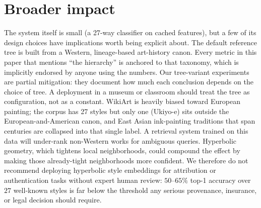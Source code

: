 \section*{Broader impact}
\label{sec:impact}

The system itself is small (a 27-way classifier on cached features),
but a few of its design choices have implications worth being explicit
about. The default reference tree is built from a Western,
lineage-based art-history canon. Every metric in this paper that
mentions ``the hierarchy'' is anchored to that taxonomy, which is
implicitly endorsed by anyone using the numbers. Our tree-variant
experiments are partial mitigation: they document how much each
conclusion depends on the choice of tree. A deployment in a museum or
classroom should treat the tree as configuration, not as a constant.
WikiArt is heavily biased toward European painting; the corpus has
27 styles but only one (Ukiyo-e) sits outside the European-and-American
canon, and East Asian ink-painting traditions that span centuries are
collapsed into that single label. A retrieval system trained on this
data will under-rank non-Western works for ambiguous queries.
Hyperbolic geometry, which tightens local neighborhoods, could
compound the effect by making those already-tight neighborhoods more
confident. We therefore do not recommend deploying
hyperbolic style embeddings for attribution or authentication tasks
without expert human review: $50$--$65\%$ top-1 accuracy over $27$
well-known styles is far below the threshold any serious provenance,
insurance, or legal decision should require.
